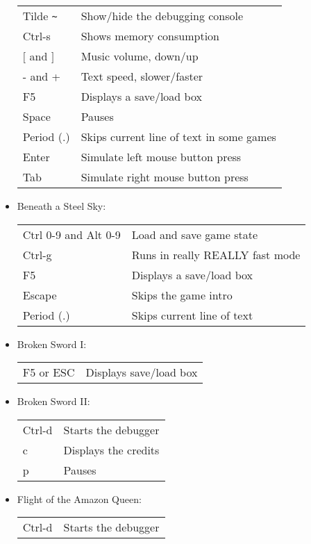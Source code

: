 \begin{itemize}
\begin{tabular}{ll}
    Tilde \verb#~#         & Show/hide the debugging console\\
    Ctrl-s                 & Shows memory consumption\\
    $[$ and $]$                & Music volume, down/up\\
    - and +                & Text speed, slower/faster\\
    F5                     & Displays a save/load box\\
    Space                  & Pauses\\
    Period (.)             & Skips current line of text in some games\\
    Enter                  & Simulate left mouse button press\\
    Tab                    & Simulate right mouse button press\\
  \end{tabular}
\item Beneath a Steel Sky:\\
  \begin{tabular}{ll}
    Ctrl 0-9 and Alt 0-9   & Load and save game state\\
    Ctrl-g                 & Runs in really REALLY fast mode\\
    F5                     & Displays a save/load box\\
    Escape                 & Skips the game intro\\
    Period (.)             & Skips current line of text\\
  \end{tabular}
\item Broken Sword I:\\
  \begin{tabular}{ll}
    F5 or ESC              & Displays save/load box\\
  \end{tabular}
\item Broken Sword II:\\
  \begin{tabular}{ll}
    Ctrl-d                 & Starts the debugger\\
    c                      & Displays the credits\\
    p                      & Pauses\\
  \end{tabular}
\item Flight of the Amazon Queen:
  \begin{tabular}{ll}
    Ctrl-d                 & Starts the debugger\\

\end{tabular}
\end{itemize}
